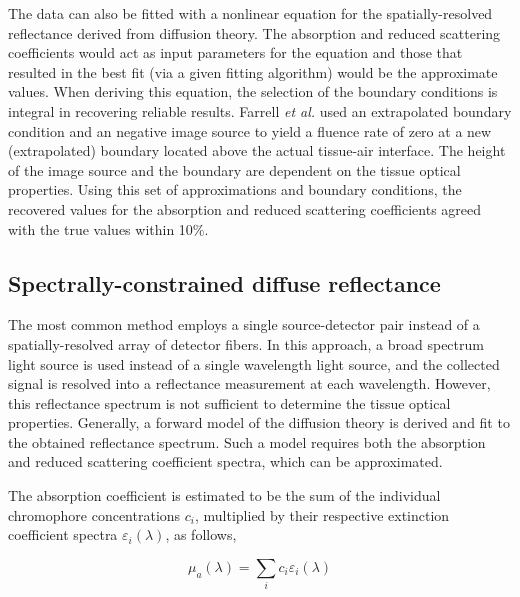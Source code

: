 The data can also be fitted with a nonlinear equation for the spatially-resolved reflectance derived from diffusion theory. The absorption and reduced scattering coefficients would act as input parameters for the equation and those that resulted in the best fit (via a given fitting algorithm) would be the approximate values. When deriving this equation, the selection of the boundary conditions is integral in recovering reliable results. Farrell \emph{et al.}\cite{Farrell1992} used an extrapolated boundary condition and an negative image source to yield a fluence rate of zero at a new (extrapolated) boundary located above the actual tissue-air interface. The height of the image source and the boundary are dependent on the tissue optical properties. Using this set of approximations and boundary conditions, the recovered values for the absorption and reduced scattering coefficients agreed with the true values within 10\%.


\subsection{Spectrally-constrained diffuse reflectance}
\label{spec_diff_refl}
The most common method employs a single source-detector pair instead of a spatially-resolved array of detector fibers. In this approach, a broad spectrum light source is used instead of a single wavelength light source, and the collected signal is resolved into a reflectance measurement at each wavelength. However, this reflectance spectrum is not sufficient to determine the tissue optical properties. Generally, a forward model of the diffusion theory is derived and fit to the obtained reflectance spectrum. Such a model requires both the absorption and reduced scattering coefficient spectra, which can be approximated.

The absorption coefficient is estimated to be the sum of the individual chromophore concentrations $c_i$, multiplied by their respective extinction coefficient spectra $\varepsilon_i(\lambda)$, as follows,

\begin{equation}
\mu_a(\lambda) = \sum_i c_i \varepsilon_i(\lambda)
\end{equation}


